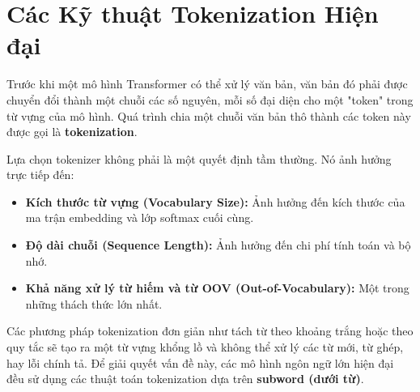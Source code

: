 
\section{Các Kỹ thuật Tokenization Hiện đại}
\label{sec:modern_tokenization}

Trước khi một mô hình Transformer có thể xử lý văn bản, văn bản đó phải được chuyển đổi thành một chuỗi các số nguyên, mỗi số đại diện cho một "token" trong từ vựng của mô hình. Quá trình chia một chuỗi văn bản thô thành các token này được gọi là \textbf{tokenization}.

Lựa chọn tokenizer không phải là một quyết định tầm thường. Nó ảnh hưởng trực tiếp đến:
\begin{itemize}
    \item \textbf{Kích thước từ vựng (Vocabulary Size):} Ảnh hưởng đến kích thước của ma trận embedding và lớp softmax cuối cùng.
    \item \textbf{Độ dài chuỗi (Sequence Length):} Ảnh hưởng đến chi phí tính toán và bộ nhớ.
    \item \textbf{Khả năng xử lý từ hiếm và từ OOV (Out-of-Vocabulary):} Một trong những thách thức lớn nhất.
\end{itemize}

Các phương pháp tokenization đơn giản như tách từ theo khoảng trắng hoặc theo quy tắc sẽ tạo ra một từ vựng khổng lồ và không thể xử lý các từ mới, từ ghép, hay lỗi chính tả. Để giải quyết vấn đề này, các mô hình ngôn ngữ lớn hiện đại đều sử dụng các thuật toán tokenization dựa trên \textbf{subword (dưới từ)}.

